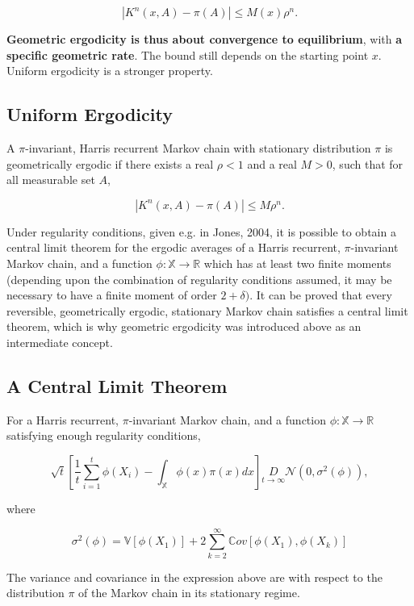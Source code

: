 \documentclass[10pt]{article}
\begin{document}
$$
\left|K^{n}(x, A)-\pi(A)\right| \leq M(x) \rho^{n} .
$$

\textbf{Geometric ergodicity is thus about convergence to equilibrium}, with \textbf{a specific geometric rate}. The bound still depends on the starting point $x$. Uniform ergodicity is a stronger property.

\subsection{Uniform Ergodicity}
 A $\pi$-invariant, Harris recurrent Markov chain with stationary distribution $\pi$ is geometrically ergodic if there exists a real $\rho<1$ and a real $M>0$, such that for all measurable set $A$,

$$
\left|K^{n}(x, A)-\pi(A)\right| \leq M \rho^{n} .
$$

Under regularity conditions, given e.g. in Jones, 2004, it is possible to obtain a central limit theorem for the ergodic averages of a Harris recurrent, $\pi$-invariant Markov chain, and a function $\phi: \mathbb{X} \rightarrow \mathbb{R}$ which has at least two finite moments (depending upon the combination of regularity conditions assumed, it may be necessary to have a finite moment of order $2+\delta)$. It can be proved that every reversible, geometrically ergodic, stationary Markov chain satisfies a central limit theorem, which is why geometric ergodicity was introduced above as an intermediate concept.

\subsection{A Central Limit Theorem} 
For a Harris recurrent, $\pi$-invariant Markov chain, and a function $\phi: \mathbb{X} \rightarrow \mathbb{R}$ satisfying enough regularity conditions,

$$
\sqrt{t}\left[\frac{1}{t} \sum_{i=1}^{t} \phi\left(X_{i}\right)-\int_{\mathbb{X}} \phi(x) \pi(x) d x\right] \underset{t \rightarrow \infty}{D} \mathcal{N}\left(0, \sigma^{2}(\phi)\right),
$$

where

$$
\sigma^{2}(\phi)=\mathbb{V}\left[\phi\left(X_{1}\right)\right]+2 \sum_{k=2}^{\infty} \mathbb{C} o v\left[\phi\left(X_{1}\right), \phi\left(X_{k}\right)\right]
$$

The variance and covariance in the expression above are with respect to the distribution $\pi$ of the Markov chain in its stationary regime.
\end{document}
